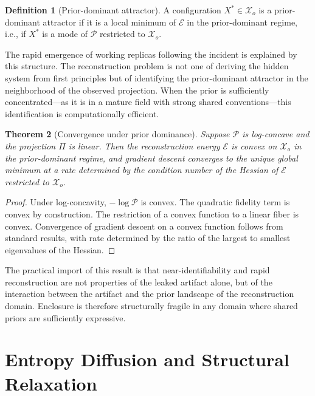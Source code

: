 \documentclass[12pt, oneside]{article}
\theoremstyle{plain}
\newtheorem{theorem}{Theorem}[section]
\theoremstyle{definition}
\newtheorem{definition}[theorem]{Definition}
\theoremstyle{remark}
\newcommand{\proj}{\Pi}
\newcommand{\energy}{\mathcal{E}}
\newcommand{\config}{\mathcal{X}}
\newcommand{\prior}{\mathcal{P}}
\begin{document}
\begin{definition}[Prior-dominant attractor]
A configuration $X^* \in \config_o$ is a prior-dominant attractor if it is a local minimum
of $\energy$ in the prior-dominant regime, i.e., if $X^*$ is a mode of $\prior$ restricted
to $\config_o$.
\end{definition}

The rapid emergence of working replicas following the incident is explained by this
structure. The reconstruction problem is not one of deriving the hidden system from first
principles but of identifying the prior-dominant attractor in the neighborhood of the
observed projection. When the prior is sufficiently concentrated---as it is in a mature
field with strong shared conventions---this identification is computationally efficient.

\begin{theorem}[Convergence under prior dominance]
Suppose $\prior$ is log-concave and the projection $\proj$ is linear. Then the reconstruction
energy $\energy$ is convex on $\config_o$ in the prior-dominant regime, and gradient descent
converges to the unique global minimum at a rate determined by the condition number of the
Hessian of $\energy$ restricted to $\config_o$.
\end{theorem}

\begin{proof}
Under log-concavity, $-\log \prior$ is convex. The quadratic fidelity term is convex by
construction. The restriction of a convex function to a linear fiber is convex. Convergence
of gradient descent on a convex function follows from standard results, with rate determined
by the ratio of the largest to smallest eigenvalues of the Hessian.
\end{proof}

The practical import of this result is that near-identifiability and rapid reconstruction
are not properties of the leaked artifact alone, but of the interaction between the artifact
and the prior landscape of the reconstruction domain. Enclosure is therefore structurally
fragile in any domain where shared priors are sufficiently expressive.

\section{Entropy Diffusion and Structural Relaxation}
\end{document}
